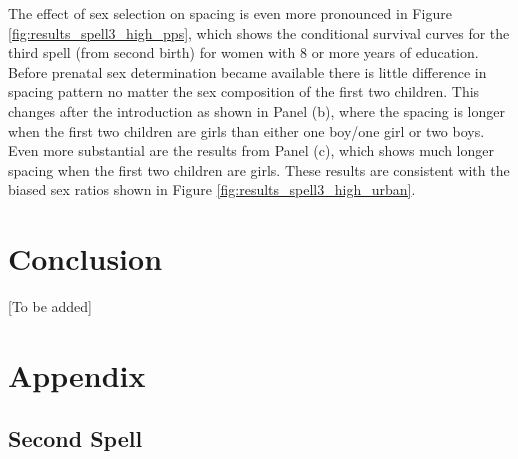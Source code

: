 \documentclass[12pt,letterpaper]{article}
\begin{document}
The effect of sex selection on spacing is even more pronounced in
Figure \ref{fig:results_spell3_high_pps}, which shows the conditional
survival curves for the third spell (from second birth) for women with
8 or more years of education.
Before prenatal sex determination became available there is little difference
in spacing pattern no matter the sex composition of the first two children.
This changes after the introduction as shown in Panel (b), where the spacing
is longer when the first two children are girls than either one boy/one girl
or two boys.
Even more substantial are the results from Panel (c), which shows much 
longer spacing when the first two children are girls.
These results are consistent with the biased sex ratios shown in 
Figure \ref{fig:results_spell3_high_urban}.



\section{Conclusion\label{sec:conclusion}}


[To be added]




\clearpage

\onehalfspacing






\clearpage
\newpage

\appendix
\section{Appendix}

\renewcommand\thefigure{\thesection.\arabic{figure}}    
\setcounter{figure}{0}
\renewcommand\thetable{\thesection.\arabic{table}}    
\setcounter{table}{0}
  



\clearpage

\subsection{Second Spell}
\end{document}
